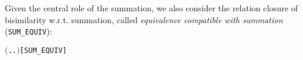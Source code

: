 Given the central role of the  
 summation, we also consider the relation closure of bisimilarity
 w.r.t. summation, called \emph{equivalence compatible with summation}
(\texttt{SUM_EQUIV}): %
\begin{alltt}
    \HOLSymConst{\HOLTokenDefEquality{}} \ensuremath{(}\HOLTokenLambda{} . \HOLSymConst{\HOLTokenForall{}}.  \HOLSymConst{\ensuremath{+}}  \HOLSymConst{\HOLTokenWeakEQ}  \HOLSymConst{\ensuremath{+}} \ensuremath{)}\hfill{[SUM_EQUIV]}
\end{alltt}

%

